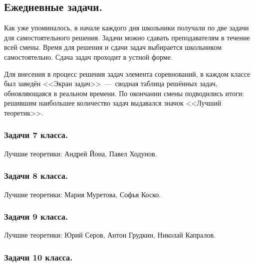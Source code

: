 \documentclass[12pt,a4paper,oneside,draft]{scrartcl}
\newcounter{notask}
\newlength{\h}
\newlength{\x}
\begin{document}
\subsection{Ежедневные задачи.}
\label{sec:2-a-day}

Как уже упоминалось, в начале каждого дня школьники получали по две
задачи для самостоятельного решения. Задачи можно сдавать
преподавателям в течение всей смены. Время для решения и сдачи задач
выбирается школьником самостоятельно. Сдача задач проходит в устной
форме.

Для внесения в процесс решения задач элемента соревнований, в каждом
классе был заведён <<Экран задач>>~---~сводная таблица решённых задач,
обновляющаяся в реальном времени. По окончании смены подводились
итоги: решившим наибольшее количество задач выдавался значок <<Лучший
теоретик>>. 

\subsubsection{Задачи 7 класса.}
\label{sec:2-a-day_7}

\setcounter{notask}{1}
\vspace{1cm}

Лучшие теоретики: Андрей Йона, Павел Ходунов. 

\subsubsection{Задачи 8 класса.}
\label{sec:2-a-day_8}

\setcounter{notask}{1}
\vspace{1cm}

Лучшие теоретики: Мария Муретова, Софья Коско. 

\subsubsection{Задачи 9 класса.}
\label{sec:2-a-day_9}

\setcounter{notask}{1}
\vspace{1cm}

Лучшие теоретики: Юрий Серов, Антон Грудкин, Николай Капралов. 

\subsubsection{Задачи 10 класса.}
\label{sec:2-a-day_10}

\setcounter{notask}{1}
\vspace{1cm}
\end{document}
